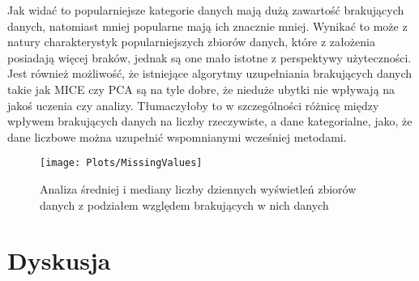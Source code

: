 Jak widać to popularniejsze kategorie danych mają dużą zawartość brakujących danych, natomiast mniej popularne mają ich znacznie mniej.
Wynikać to może z natury charakterystyk popularniejszych zbiorów danych, które z założenia posiadają więcej braków, jednak są one mało istotne z perspektywy użyteczności.
Jest również możliwość, że istniejące algorytmy uzupełniania brakujących danych takie jak MICE czy PCA są na tyle dobre, że nieduże ubytki nie wpływają na jakoś uczenia czy analizy.
Tłumaczyłoby to w szczególności różnicę między wpływem brakujących danych na liczby rzeczywiste, a dane kategorialne, jako, że dane liczbowe można uzupełnić wspomnianymi wcześniej metodami.

\begin{figure}[ht]
  \texttt{[image: Plots/MissingValues]}
  \caption{Analiza średniej i mediany liczby dziennych wyświetleń zbiorów danych z podziałem względem brakujących w nich danych}
  \label{fig:missingvalues}
\end{figure}

\section{Dyskusja}
